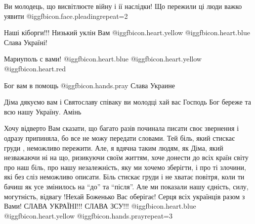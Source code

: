 \begin{itemize}

Ви молодець, що висвітлюєте війну і ії наслідки! Що пережили ці люди важко уявити @igg{fbicon.face.pleading}{repeat=2} 

Наші кіборги!!! Низький уклін Вам  @igg{fbicon.heart.yellow}  @igg{fbicon.heart.blue} Слава Україні!

Мариуполь с вами! @igg{fbicon.heart.blue}  @igg{fbicon.heart.yellow} @igg{fbicon.heart.red}

Бог вам в помощь  @igg{fbicon.hands.pray}  Слава Украине

Діма дякуємо вам і Святославу співаку ви молодці хай вас Господь Бог береже та
всю нашу Україну. Амінь


Хочу відверто Вам сказати, що багато разів починала писати своє звернення і
одразу припиняла, бо все не можу передати словами. Тей біль, який стискає груди
, неможливо пережити. Але, я вдячна таким людям, як Діма, який незважаючи ні на
що, ризикуючи своїм життям, хоче донести до всіх країн світу про наш біль, про
нашу незалежність, яку ми хочемо зберігти, і про ті злочини, які без сліз
неможливо описати. Біль стискає груди і не хватає повітря, коли ти бачиш як усе
змінилось на \enquote{до} та \enquote{після}. Але ми показали нашу єдність,
силу, могутність, відвагу !Нехай Боженько Вас оберігає! Серця всіх українців
разом з Вами! СЛАВА УКРАЇНІ!!! СЛАВА ЗСУ!!! @igg{fbicon.heart.blue}
@igg{fbicon.heart.yellow}  @igg{fbicon.hands.pray}{repeat=3} 


\end{itemize} %
